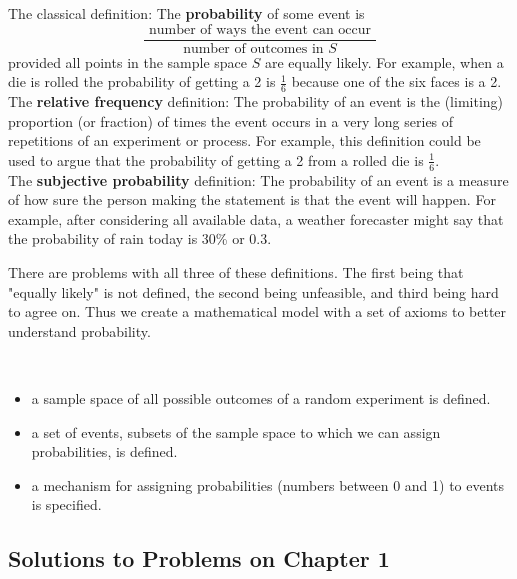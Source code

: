 \documentclass[english, 11pt]{article}
\begin{document}
  \begin{defn}
    The classical definition: The \textbf{probability} of some event is
    \[ \frac{ \mbox { number of ways the event can occur } }{ \mbox {number of outcomes in } S } \]
    provided all points in the sample space $S$ are equally likely. For example, when a die is rolled the probability of getting a 2 is $\frac{1}{6}$ because one of the six faces is a 2. \\

    The \textbf{relative frequency} definition: The probability of an event is the (limiting) proportion (or fraction) of times the event occurs in a very long series of repetitions of an experiment or process. For example, this definition could be used to argue that the probability of getting a 2 from a rolled die is $\frac{1}{6}$. \\

    The \textbf{subjective probability} definition: The probability of an event is a measure of how sure the person making the statement is that the event will happen. For example, after considering all available data, a weather forecaster might say that the probability of rain today is 30\% or 0.3.
  \end{defn}

  There are problems with all three of these definitions. The first being that "equally likely" is not defined, the second being unfeasible, and third being hard to agree on. Thus we create a mathematical model with a set of axioms to better understand probability. \newpage

  \begin{defn}\label{probability model}
  \
     \begin{itemize}
       \item a sample space of all possible outcomes of a random experiment is defined.
       \item a set of events, subsets of the sample space to which we can assign probabilities, is defined.
       \item a mechanism for assigning probabilities (numbers between 0 and 1) to events is specified.
     \end{itemize}
  \end{defn}


  \subsection{Solutions to Problems on Chapter 1}
\end{document}
